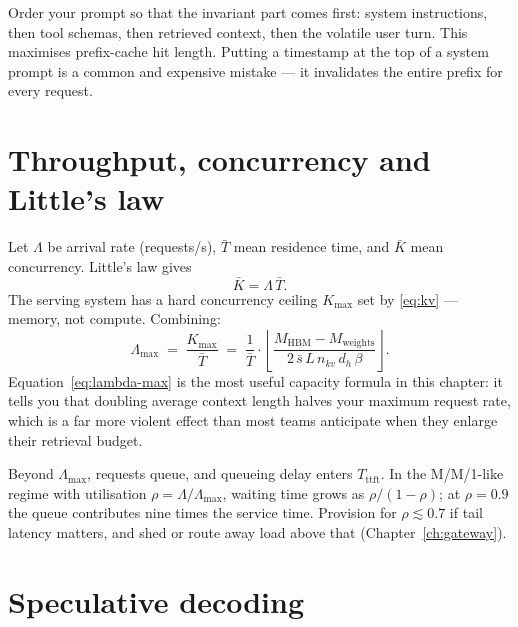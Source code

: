\documentclass[11pt,twoside,openright]{book}
\theoremstyle{definition}
\theoremstyle{plain}
\theoremstyle{remark}
\newcommand{\ttft}{\ensuremath{T_{\mathrm{ttft}}}}
\begin{document}
\begin{practice}
Order your prompt so that the invariant part comes first: system instructions,
then tool schemas, then retrieved context, then the volatile user turn. This
maximises prefix-cache hit length. Putting a timestamp at the top of a system
prompt is a common and expensive mistake --- it invalidates the entire prefix
for every request.
\end{practice}

\section{Throughput, concurrency and Little's law}

Let $\Lambda$ be arrival rate (requests/s), $\bar{T}$ mean residence time, and
$\bar{K}$ mean concurrency. Little's law gives
\begin{equation}
  \bar{K} = \Lambda\, \bar{T}.
\label{eq:little}
\end{equation}
The serving system has a hard concurrency ceiling $K_{\max}$ set by
\eqref{eq:kv} --- memory, not compute. Combining:
\begin{equation}
  \Lambda_{\max} \;=\; \frac{K_{\max}}{\bar{T}}
  \;=\; \frac{1}{\bar{T}} \cdot
    \left\lfloor \frac{M_{\text{HBM}} - M_{\text{weights}}}
                      {2\,\bar{s}\,L\,n_{kv}\,d_h\,\beta} \right\rfloor .
\label{eq:lambda-max}
\end{equation}
Equation~\eqref{eq:lambda-max} is the most useful capacity formula in this
chapter: it tells you that doubling average context length halves your maximum
request rate, which is a far more violent effect than most teams anticipate when
they enlarge their retrieval budget.

Beyond $\Lambda_{\max}$, requests queue, and queueing delay enters \ttft{}. In
the M/M/1-like regime with utilisation $\rho = \Lambda/\Lambda_{\max}$, waiting
time grows as $\rho/(1-\rho)$; at $\rho = 0.9$ the queue contributes nine times
the service time. Provision for $\rho \lesssim 0.7$ if tail latency matters, and
shed or route away load above that (Chapter~\ref{ch:gateway}).

\section{Speculative decoding}
\end{document}
